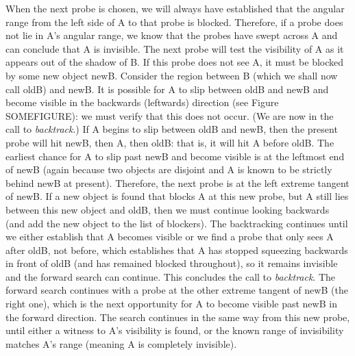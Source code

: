 \documentclass[12pt]{article}
\newif\ifJournal
\begin{document}
When the next probe is chosen,
we will always have established that the angular range from the left side of A
to that probe is blocked.
Therefore, if a probe does not lie in A's angular range, we know that
the probes have swept across A and can conclude that A is invisible.
The next probe will test the visibility of A as it appears out of the shadow of B.
If this probe does not see A, it must be blocked by some new object newB.
Consider the region between B (which we shall now call oldB) and newB.
It is possible for A to slip between oldB and newB and become visible in the 
backwards (leftwards) direction (see Figure SOMEFIGURE): 
we must verify that this does not occur.
(We are now in the call to {\em backtrack}.)
If A begins to slip between oldB and newB, then the present probe will hit newB,
then A, then oldB: that is, it will hit A before oldB.
The earliest chance for A to slip past newB and become visible is at the leftmost
end of newB (again because two objects are disjoint and A is known to be strictly behind
newB at present).
Therefore, the next probe is at the left extreme tangent of newB.
If a new object is found that blocks A at this new probe, but A still lies between
this new object and oldB, then we must continue looking backwards (and add the new
object to the list of blockers).
The backtracking continues until we either establish that A becomes visible
or we find a probe that only sees A after oldB, not before, which establishes
that A has stopped squeezing backwards in front of oldB (and has remained blocked
throughout), so it remains invisible and the forward search can continue.
This concludes the call to {\em backtrack}.
The forward search continues with a probe at the other extreme tangent of newB
(the right one), which is the next opportunity for A to become visible past newB
in the forward direction.
The search continues in the same way from this new probe, until 
either a witness to A's visibility is found, or the known range
of invisibility matches A's range (meaning A is completely invisible).
\QED

\ifJournal
We can improve the algorithm for {\em objectvisibility} by reinterpreting
probe(RAY).
Rather than choosing the first object hit by the probe, we could technically
choose any object that is hit before A: we are just looking for an object that blocks 
the probe.
The optimal choice is the object before A that extends the covered range the most.
We prefer to use this version of the algorithm, where probe(RAY) is the object
hit by the probe RAY before A that most extends the covered range (i.e., whose clockwise
extreme tangent is furthest clockwise).
\fi
\end{document}
